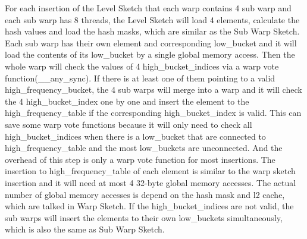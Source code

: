 \documentclass[conference]{IEEEtran}
\begin{document}
For each insertion of the Level Sketch that each warp contains 4 sub warp and each sub warp has 8 threads, the Level Sketch will load 4 elements, calculate the hash values and load the hash masks, which are similar as the Sub Warp Sketch. Each sub warp has their own element and corresponding low\_bucket and it will load the contents of its low\_bucket by a single global memory access. Then the whole warp will check the values of 4 high\_bucket\_indices via a warp vote function(\_\_any\_sync). If there is at least one of them pointing to a valid high\_frequency\_bucket, the 4 sub warps will merge into a warp and it will check the 4 high\_bucket\_index one by one and insert the element to the high\_frequency\_table if the corresponding high\_bucket\_index is valid. This can save some warp vote functions because it will only need to check all high\_bucket\_indices when there is a low\_bucket that are connected to high\_frequency\_table and the most low\_buckets are unconnected. And the overhead of this step is only a warp vote function for most insertions. The insertion to high\_frequency\_table of each element is similar to the warp sketch insertion and it will need at most 4 32-byte global memory accesses. The actual number of global memory accesses is depend on the hash mask and l2 cache, which are talked in Warp Sketch. If the high\_bucket\_indices are not valid, the sub warps will insert the elements to their own low\_buckets simultaneously, which is also the same as Sub Warp Sketch. 

\end{document}
